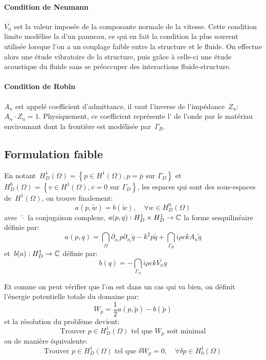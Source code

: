 \paragraph{Condition de Neumann}
$\overline{V_n}$ est la valeur imposée de la composante normale de la vitesse.
Cette condition limite modélise la  d'un panneau, ce qui en fait la condition la
plus souvent utilisée lorsque l'on a un couplage faible entre la structure et le fluide.
On effectue alors une étude vibratoire de la structure, puis grâce à celle-ci une
étude acoustique du fluide sans se préoccuper des interactions fluide-structure.

\medskip
\paragraph{Condition de Robin}
$A_n$ est appelé coefficient d'admittance, il vaut l'inverse de l'impédance~$Z_n$:
$A_n\cdot Z_n=1$.
Physiquement, ce coefficient représente l' de l'onde par le matériau environnant
dont la frontière est modélisée par~$\Gamma_R$.

\medskip
\subsection{Formulation faible}
En notant~$H^1_D(\Omega)=\left\{p\in H^1(\Omega), p=\overline{p} \text{ sur } \Gamma_D\right\}$ et
$H^0_D(\Omega)=\left\{v\in H^1(\Omega), v=0 \text{ sur } \Gamma_D\right\}$, les espaces qui sont
des sous-espaces de~$H^1(\Omega)$, on trouve finalement:
\begin{equation}a(p,\tilde{w})=b(\tilde{w}), \quad \forall w\in H^0_D(\Omega)\end{equation}
avec~$\tilde{\cdot}$ la conjugaison complexe, $a(p,q): H^1_D\times H^1_D \rightarrow \mathbb C$ la forme
sesquilinéaire définie par:
\begin{equation}a(p,q)=\dint_\Omega \partial_{x_i}p\partial_{x_i}\tilde{q}-k^2p\tilde{q} +
\dint_{\Gamma_R} i\rho ckA_n\tilde{q}
\end{equation}
et~$b(a): H^1_D\rightarrow\mathbb C$ définie par:
\begin{equation}b(q)=-\dint_{\Gamma_N} i\rho c k\overline{V_n} q\end{equation}

\medskip
Et comme on peut vérifier que l'on est dans un cas qui va bien, on définit l'énergie
potentielle totale du domaine par:
\begin{equation}W_p=\frac12 a(p,\tilde{p})-b(\tilde{p})\end{equation}
et la résolution du problème devient:
\begin{equation}
\text{Trouver } p\in H^1_D(\Omega) \text{ tel que } W_p \text{ soit minimal}
\end{equation}
ou de manière équivalente:
\begin{equation}
\text{Trouver } p\in H^1_D(\Omega) \text{ tel que } \delta W_p=0,\quad \forall\delta p\in H^1_0(\Omega)
\end{equation} 